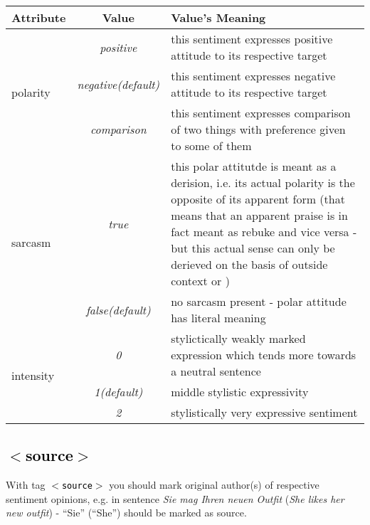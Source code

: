 \documentclass[11pt,a4paper]{article}
\newcommand{\xmltag}[1]{\textcolor{black}{{\small$<$#1$>$}}}
\begin{document}
\begin{tabular}{|l|c|p{}|}\hline
  Attribute & Value & Value's Meaning\\\hline

  \multirow{3}{*}{polarity} & \textit{positive} & this sentiment
  expresses positive attitude to its respective target\\\cline{2-3}

  & \textit{negative\newline(default)} & this sentiment
  expresses negative attitude to its respective target\\\cline{2-3}

  & \textit{comparison} & this sentiment expresses comparison of two
  things with preference given to some of them\\\hline

  \multirow{2}{*}{sarcasm} & \textit{true} & this polar attitutde is
  meant as a derision, i.e. its actual polarity is the opposite of its
  apparent form (that means that an apparent praise is in fact meant
  as rebuke and vice versa - but this actual sense can only be
  derieved on the basis of outside context or )\\\cline{2-3}

  & \textit{false\newline(default)} & no sarcasm present - polar
  attitude has literal meaning\\\hline

  \multirow{3}{*}{intensity} & \textit{0} & stylictically weakly
  marked expression which tends more towards a neutral
  sentence\\\cline{2-3}

  & \textit{1\newline(default)} & middle stylistic
  expressivity\\\cline{2-3}

  & \textit{2} & stylistically very expressive sentiment\\\hline
\end{tabular}

\subsection{\xmltag{source}}
With tag \texttt{\xmltag{source}} you should mark original author(s)
of respective sentiment opinions, e.g. in sentence \textit{Sie mag
  Ihren neuen Outfit} (\textit{She likes her new outfit}) - ``Sie''
(``She'') should be marked as source.
\end{document}
